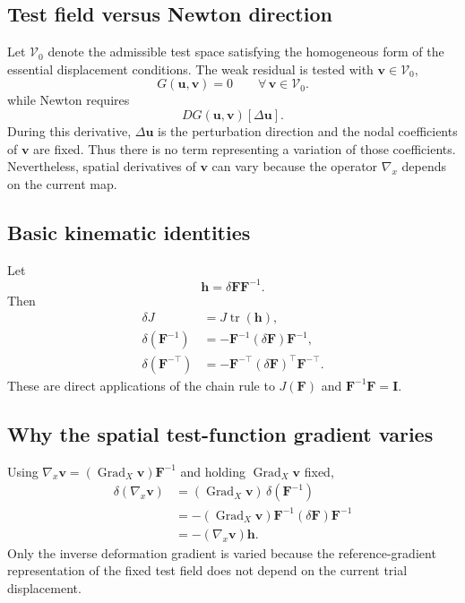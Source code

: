 \documentclass[11pt,a4paper]{article}
\newcommand{\bs}[1]{\boldsymbol{#1}}
\newcommand{\tr}{\operatorname{tr}}
\newcommand{\Grad}{\operatorname{Grad}}
\newcommand{\I}{\bs{I}}
\newcommand{\F}{\bs{F}}
\begin{document}
\subsection{Test field versus Newton direction}
Let $\mathcal V_0$ denote the admissible test space satisfying the homogeneous form of the essential displacement conditions. The weak residual is tested with $\bs v\in\mathcal V_0$,
\begin{equation}
G(\bs u,\bs v)=0
\qquad\forall\,\bs v\in\mathcal V_0.
\end{equation}
while Newton requires
\begin{equation}
DG(\bs u,\bs v)[\Delta\bs u].
\end{equation}
During this derivative, $\Delta\bs u$ is the perturbation direction and the nodal coefficients of $\bs v$ are fixed. Thus there is no term representing a variation of those coefficients. Nevertheless, spatial derivatives of $\bs v$ can vary because the operator $\nabla_x$ depends on the current map.

\subsection{Basic kinematic identities}
Let
\begin{equation}
\bs h=\delta\F\F^{-1}.
\end{equation}
Then
\begin{align}
\delta J &= J\tr(\bs h),\\
\delta(\F^{-1}) &= -\F^{-1}(\delta\F)\F^{-1},\\
\delta(\F^{-\top}) &= -\F^{-\top}(\delta\F)^\top\F^{-\top}.
\end{align}
These are direct applications of the chain rule to $J(\F)$ and $\F^{-1}\F=\I$.

\subsection{Why the spatial test-function gradient varies}
Using $\nabla_x\bs v=(\Grad_X\bs v)\F^{-1}$ and holding $\Grad_X\bs v$ fixed,
\begin{align}
\delta(\nabla_x\bs v)
&=(\Grad_X\bs v)\,\delta(\F^{-1})\\
&=-(\Grad_X\bs v)\F^{-1}(\delta\F)\F^{-1}\\
&=-(\nabla_x\bs v)\bs h.
\end{align}
Only the inverse deformation gradient is varied because the reference-gradient representation of the fixed test field does not depend on the current trial displacement.
\end{document}
